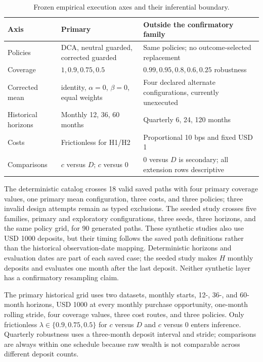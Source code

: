 \documentclass[12pt,a4paper,oneside]{report}
\begin{document}
\begin{table}[htbp]
  \centering
  \singlespacing\fontsize{9}{11}\selectfont
  \renewcommand{\arraystretch}{1.14}
  \begin{tabular}{L{0.20\textwidth}L{0.32\textwidth}L{0.37\textwidth}}
    \toprule
    \textbf{Axis} & \textbf{Primary} & \textbf{Outside the confirmatory family} \\
    \midrule
    Policies & DCA, neutral guarded, corrected guarded & Same policies; no outcome-selected replacement \\
    Coverage & $1,0.9,0.75,0.5$ & $0.99,0.95,0.8,0.6,0.25$ robustness \\
    Corrected mean & identity, $\alpha=0$, $\beta=0$, equal weights & Four declared alternate configurations, currently unexecuted \\
    Historical horizons & Monthly 12, 36, 60 months & Quarterly 6, 24, 120 months \\
    Costs & Frictionless for H1/H2 & Proportional 10 bps and fixed USD 1 \\
    Comparisons & $c$ versus $D$; $c$ versus $0$ & $0$ versus $D$ is secondary; all extension rows descriptive \\
    \bottomrule
  \end{tabular}
  \caption{Frozen empirical execution axes and their inferential boundary.}
  \label{tab:protocol-grid}
\end{table}

The deterministic catalog crosses 18 valid saved paths with four primary
coverage values, one primary mean configuration, three costs, and three
policies; three invalid design attempts remain as typed exclusions. The seeded
study crosses five families, primary and exploratory configurations, three
seeds, three horizons, and the same policy grid, for 90 generated paths. These
synthetic studies also use USD 1000 deposits, but their timing follows the
saved path definitions rather than the historical observation-date mapping.
Deterministic horizons and evaluation dates are part of each saved case; the
seeded study makes $H$ monthly deposits and evaluates one month after the last
deposit. Neither synthetic layer has a confirmatory resampling claim.

The primary historical grid uses two datasets, monthly starts, 12-, 36-, and
60-month horizons, USD 1000 at every monthly purchase opportunity, one-month
rolling stride, four coverage values, three cost routes, and three policies.
Only frictionless $\lambda\in\{0.9,0.75,0.5\}$ for $c$ versus $D$ and $c$
versus $0$ enters inference. Quarterly robustness uses a three-month deposit
interval and stride; comparisons are always within one schedule because raw
wealth is not comparable across different deposit counts.
\end{document}
